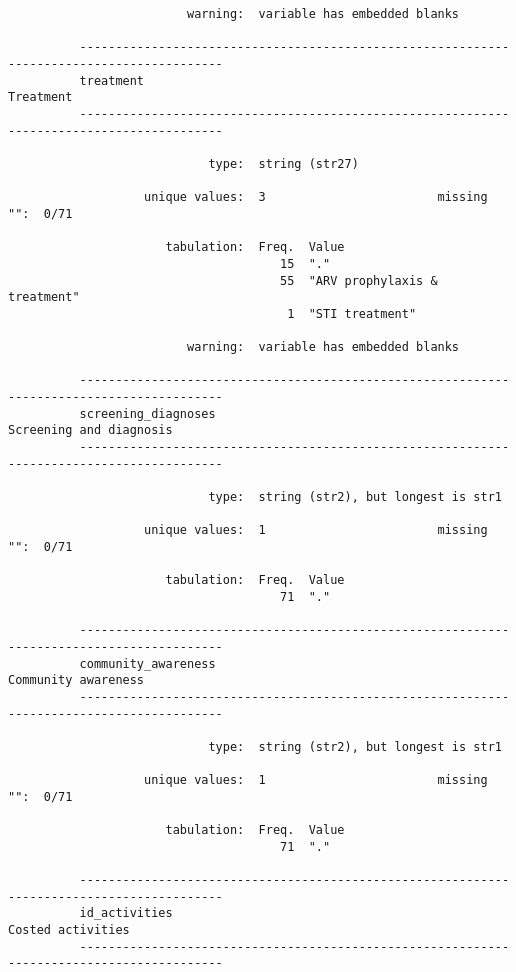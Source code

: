 \documentclass{article}
\begin{document}
\begin{verbatim}
                         warning:  variable has embedded blanks
          
          ------------------------------------------------------------------------------------------
          treatment                                                                        Treatment
          ------------------------------------------------------------------------------------------
          
                            type:  string (str27)
          
                   unique values:  3                        missing "":  0/71
          
                      tabulation:  Freq.  Value
                                      15  "."
                                      55  "ARV prophylaxis & treatment"
                                       1  "STI treatment"
          
                         warning:  variable has embedded blanks
          
          ------------------------------------------------------------------------------------------
          screening_diagnoses                                                Screening and diagnosis
          ------------------------------------------------------------------------------------------
          
                            type:  string (str2), but longest is str1
          
                   unique values:  1                        missing "":  0/71
          
                      tabulation:  Freq.  Value
                                      71  "."
          
          ------------------------------------------------------------------------------------------
          community_awareness                                                    Community awareness
          ------------------------------------------------------------------------------------------
          
                            type:  string (str2), but longest is str1
          
                   unique values:  1                        missing "":  0/71
          
                      tabulation:  Freq.  Value
                                      71  "."
          
          ------------------------------------------------------------------------------------------
          id_activities                                                            Costed activities
          ------------------------------------------------------------------------------------------
          

\end{verbatim}
\end{document}
